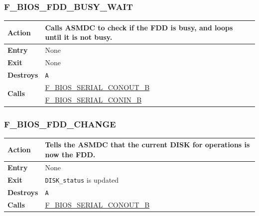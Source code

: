 \documentclass[a4paper,11pt]{article}
\begin{document}
        \subsubsection{F\_BIOS\_FDD\_BUSY\_WAIT}
        \label{func:fbiosfddbusywait}
        \begin{tabular}{l p{9cm}}
            \hline\textbf{Action}
            & Calls \textbf{ASMDC} to check if the \textbf{FDD} is busy, and
            loops until it is not busy. \\
            \hline\textbf{Entry} & None \\
            \hline\textbf{Exit} & None \\
            \hline\textbf{Destroys} & \texttt{A} \\
            \hline\multirow[t]{2}{4em}{\textbf{Calls}}
            & \hyperref[func:fbiosserialconoutb]{F\_BIOS\_SERIAL\_CONOUT\_B}\\
            & \hyperref[func:fbiosserialconinb]{F\_BIOS\_SERIAL\_CONIN\_B}\\
            \hline
        \end{tabular}

        \subsubsection{F\_BIOS\_FDD\_CHANGE}
        \label{func:fbiosfddchange}
        \begin{tabular}{l p{9cm}}
            \hline\textbf{Action}
            & Tells the \textbf{ASMDC} that the current \textbf{DISK} for
            operations is now the \textbf{FDD}. \\
            \hline\textbf{Entry} & None \\
            \hline\textbf{Exit} & \texttt{DISK\_status} is updated\\
            \hline\textbf{Destroys} & \texttt{A} \\
            \hline\textbf{Calls}
            & \hyperref[func:fbiosserialconoutb]{F\_BIOS\_SERIAL\_CONOUT\_B}\\
            \hline
        \end{tabular}

\end{document}
